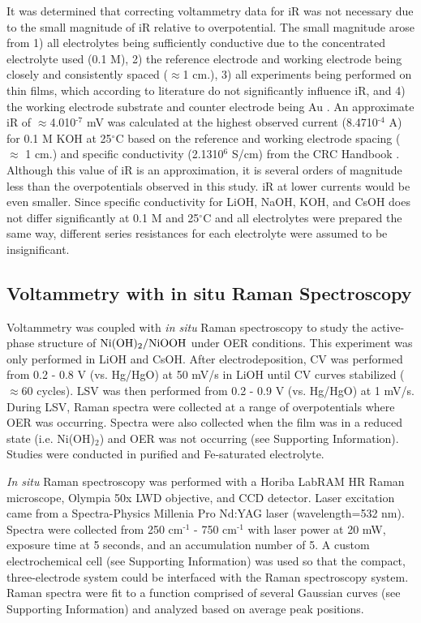 \documentclass[journal=jpccck,manuscript=article,email=true]{achemso}
\begin{document}
It was determined that correcting voltammetry data for iR was not necessary due to the small magnitude of iR relative to overpotential. The small magnitude arose from 1) all electrolytes being sufficiently conductive due to the concentrated electrolyte used (0.1 M), 2) the reference electrode and working electrode being closely and consistently spaced ($\approx$1 cm.), 3) all experiments being performed on thin films, which according to literature do not significantly influence iR, and 4) the working electrode substrate and counter electrode being Au \cite{trotochaud-2014-precis}.
An approximate iR of $\approx$4.0\texttimes{}10$^{\text{-7}}$ mV was calculated at the highest observed current (8.47\texttimes{}10$^{\text{-4}}$ A) for 0.1 M KOH at 25$^{\circ{}}$C based on the reference and working electrode spacing ($\approx$ 1 cm.) and specific conductivity (2.13\texttimes{}10$^{\text{6}}$ S/cm) from the CRC Handbook \cite{crc-95}. Although this value of iR is an approximation, it is several orders of magnitude less than the overpotentials observed in this study. iR at lower currents would be even smaller. Since specific conductivity for LiOH, NaOH, KOH, and CsOH does not differ significantly at 0.1 M and 25$^{\circ{}}$C and all electrolytes were prepared the same way, different series resistances for each electrolyte were assumed to be insignificant.

\subsection{Voltammetry with in situ Raman Spectroscopy}
\label{sec-2-3}
Voltammetry was coupled with \emph{in situ} Raman spectroscopy to study the active-phase structure of \(\ce{Ni(OH)2}/\ce{NiOOH}\) under OER conditions. This experiment was only performed in LiOH and CsOH. After electrodeposition, CV was performed from 0.2 - 0.8 V (vs. Hg/HgO) at 50 mV/s in LiOH until CV curves stabilized ($\approx$60 cycles). LSV was then performed from 0.2 - 0.9 V (vs. Hg/HgO) at 1 mV/s. During LSV, Raman spectra were collected at a range of overpotentials where OER was occurring. Spectra were also collected when the film was in a reduced state (i.e. Ni(OH)$_{\text{2}}$) and OER was not occurring (see Supporting Information). Studies were conducted in purified and Fe-saturated electrolyte.

\emph{In situ} Raman spectroscopy was performed with a Horiba LabRAM HR Raman microscope, Olympia 50x LWD objective, and CCD detector. Laser excitation came from a Spectra-Physics Millenia Pro Nd:YAG laser (wavelength=532 nm). Spectra were collected from 250 cm$^{\text{-1}}$ - 750 cm$^{\text{-1}}$ with laser power at 20 mW, exposure time at 5 seconds, and an accumulation number of 5. A custom electrochemical cell (see Supporting Information) was used so that the compact, three-electrode system could be interfaced with the Raman spectroscopy system. Raman spectra were fit to a function comprised of several Gaussian curves (see Supporting Information) and analyzed based on average peak positions.
\end{document}
